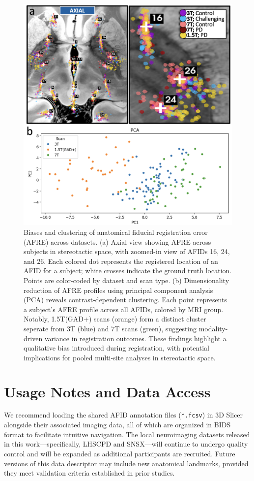 \begin{figure}
    \centering
    \includegraphics[width=1\linewidth]{figs/ch2_Figure_bias.png}
    \caption{Biases and clustering of anatomical fiducial registration error (AFRE) across datasets. (a) Axial view showing AFRE across subjects in stereotactic space, with zoomed-in view of AFIDs 16, 24, and 26. Each colored dot represents the registered location of an AFID for a subject; white crosses indicate the ground truth location. Points are color-coded by dataset and scan type. (b) Dimensionality reduction of AFRE profiles using principal component analysis (PCA) reveals contrast-dependent clustering. Each point represents a subject's AFRE profile across all AFIDs, colored by MRI group. Notably, 1.5T(GAD+) scans (orange) form a distinct cluster seperate from 3T (blue) and 7T scans (green), suggesting modality-driven variance in registration outcomes. These findings highlight a qualitative bias introduced during registration, with potential implications for pooled multi-site analyses in stereotactic space.
    }
    \label{fig:ch2_Figure_bias}
\end{figure}



\section{Usage Notes and Data Access}
We recommend loading the shared AFID annotation files (\texttt{*.fcsv}) in 3D Slicer alongside their associated imaging data, all of which are organized in BIDS format to facilitate intuitive navigation. The local neuroimaging datasets released in this work—specifically, LHSCPD and SNSX—will continue to undergo quality control and will be expanded as additional participants are recruited. Future versions of this data descriptor may include new anatomical landmarks, provided they meet validation criteria established in prior studies.


